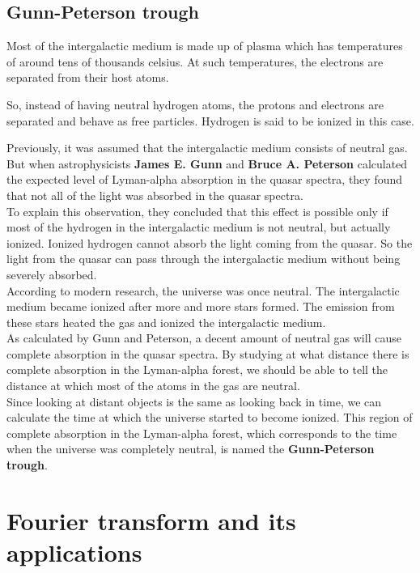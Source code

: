 \documentclass[a4,12pt,oneside]{report}
\begin{document}
	\section{Gunn-Peterson trough}
	Most of the intergalactic medium is made up of plasma which has temperatures of around tens of thousands celsius.
	At such temperatures, the electrons are separated from their host atoms.
	
	So, instead of having neutral hydrogen atoms, the protons and electrons are separated and behave as free particles. Hydrogen is said to be ionized in this case.
	
	Previously, it was assumed that the intergalactic medium consists of neutral gas. But when astrophysicists {\bf James E. Gunn} and {\bf Bruce A. Peterson} calculated the expected level of 
        Lyman-alpha absorption in the quasar spectra, they found that not all of the light was absorbed in the quasar spectra. 
        \\
        To explain this observation, they concluded that this effect is possible only if most of the hydrogen in the intergalactic medium is not neutral, but actually 
        ionized. Ionized hydrogen cannot absorb the light coming from the quasar.
        So the light from the quasar can pass through the intergalactic medium without being severely absorbed.
        \\
        According to modern research, the universe was once neutral. The intergalactic medium became ionized after more and more stars
        formed. The emission from these stars heated the gas and ionized the intergalactic medium.
        \\
        As calculated by Gunn and Peterson, a decent amount of neutral gas will cause complete absorption in the quasar spectra.
        By studying at what distance there is complete absorption in the Lyman-alpha forest, we should be able to tell the distance at
        which most of the atoms in the gas are neutral.
        \\
        Since looking at distant objects is the same as looking back in time, we can calculate the time at which the universe started to become ionized.
        This region of complete absorption in the Lyman-alpha forest, which corresponds to the time when the universe was completely neutral, is named the 
        {\bf Gunn-Peterson trough}.
        
     
        \chapter{Fourier transform and its applications}
        
\end{document}
